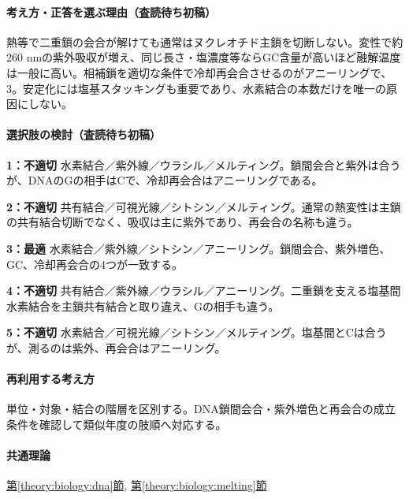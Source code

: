 \paragraph{考え方・正答を選ぶ理由（査読待ち初稿）} 熱等で二重鎖の会合が解けても通常はヌクレオチド主鎖を切断しない。変性で約260 nmの紫外吸収が増え、同じ長さ・塩濃度等ならGC含量が高いほど融解温度は一般に高い。相補鎖を適切な条件で冷却再会合させるのがアニーリングで、3。安定化には塩基スタッキングも重要であり、水素結合の本数だけを唯一の原因にしない。

\paragraph{選択肢の検討（査読待ち初稿）}\mbox{}\par

\noindent\textbf{1：不適切} 水素結合／紫外線／ウラシル／メルティング。鎖間会合と紫外は合うが、DNAのGの相手はCで、冷却再会合はアニーリングである。\par

\noindent\textbf{2：不適切} 共有結合／可視光線／シトシン／メルティング。通常の熱変性は主鎖の共有結合切断でなく、吸収は主に紫外であり、再会合の名称も違う。\par

\noindent\textbf{3：最適} 水素結合／紫外線／シトシン／アニーリング。鎖間会合、紫外増色、GC、冷却再会合の4つが一致する。\par

\noindent\textbf{4：不適切} 共有結合／紫外線／ウラシル／アニーリング。二重鎖を支える塩基間水素結合を主鎖共有結合と取り違え、Gの相手も違う。\par

\noindent\textbf{5：不適切} 水素結合／可視光線／シトシン／メルティング。塩基間とCは合うが、測るのは紫外、再会合はアニーリング。\par

\paragraph{再利用する考え方} 単位・対象・結合の階層を区別する。DNA鎖間会合・紫外増色と再会合の成立条件を確認して類似年度の肢順へ対応する。

\paragraph{共通理論} \hyperref[theory:biology:dna]{第\ref*{theory:biology:dna}節}, \hyperref[theory:biology:melting]{第\ref*{theory:biology:melting}節}

